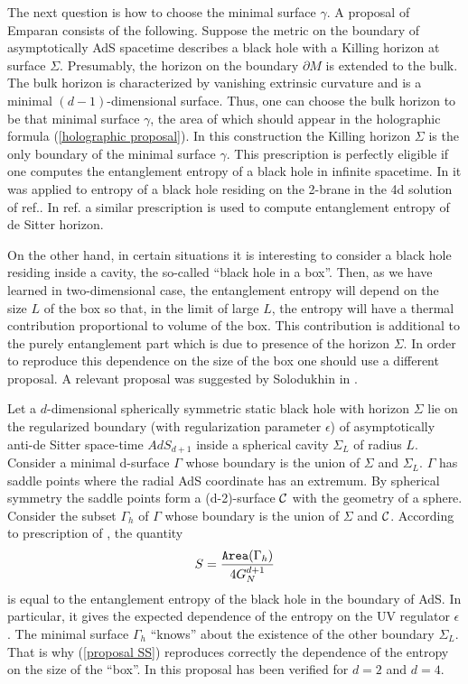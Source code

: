 \documentclass[12pt]{article}
\def\be{\begin{eqnarray}}
\def\ee{\end{eqnarray}}
\def\lb{\label}
\begin{document}
The next question is how to choose the minimal surface $\gamma$. A proposal of Emparan \cite{Emparan:2006ni} consists of the following. Suppose the metric on the boundary of asymptotically AdS spacetime describes a black hole with a Killing horizon at surface $\Sigma$. Presumably, the horizon on the boundary $\partial M$ is extended to the bulk.
The bulk horizon is characterized by vanishing extrinsic curvature and is a minimal $(d-1)$-dimensional  surface. Thus, one can choose the bulk horizon to be that  minimal surface $\gamma$,
the area of which should appear in the holographic formula (\ref{holographic proposal}). In this construction the Killing horizon $\Sigma$ is the only boundary of  the
minimal surface $\gamma$. This prescription is perfectly eligible if one computes the  entanglement entropy of a black hole in infinite spacetime. In \cite{Emparan:2006ni} it was applied to entropy of a black hole residing on the 2-brane in the 4d solution
of ref.\cite{Emparan:1999wa}.  In ref.\cite{Iwashita:2006zj} a similar prescription is used to compute entanglement entropy of de Sitter horizon.

On the other hand, in certain situations it is interesting to consider a black hole residing inside a cavity, the so-called ``black hole in a box''. Then, as we have learned  in two-dimensional case, the entanglement entropy will depend on the size $L$ of the box so that, in the limit of large $L$, the entropy will have a thermal contribution proportional to volume of the box. This contribution is additional to the purely entanglement part which is due to presence of the horizon $\Sigma$. In order to reproduce this dependence on the size of the box one should use a different proposal. A relevant proposal was suggested  by Solodukhin in \cite{Solodukhin:2006xv}. 

Let a $d$-dimensional spherically symmetric static black
hole with horizon $\Sigma$
 lie on the regularized boundary (with regularization parameter $\epsilon$)
of asymptotically anti-de Sitter space-time  $AdS_{d+1}$ inside a
spherical cavity $\Sigma_L$ of radius $L$. Consider a minimal
d-surface $\Gamma$ whose boundary is the union of $\Sigma$ and
$\Sigma_L$. $\Gamma$ has saddle points where the radial AdS
coordinate  has an extremum. By spherical symmetry the saddle points
form a (d-2)-surface ${\cal C}$ with the geometry of a sphere. Consider
the subset $\Gamma_h$ of $\Gamma$ whose boundary is  the union of
$\Sigma$ and ${\cal C}$. According to prescription of \cite{Solodukhin:2006xv}, the quantity
\be S={{\tt Area}(\Gamma_h)\over 4 G_N^{d+1}}
 \lb{proposal SS} 
 \ee is
equal to the entanglement entropy of the black hole in the boundary of
AdS. In particular, it gives the expected dependence of the
entropy on the UV regulator $\epsilon$. The minimal surface $\Gamma_h$ ``knows'' about the existence of the other boundary $\Sigma_L$. That is why (\ref{proposal SS}) reproduces correctly the dependence of the entropy on the size of the ``box''. 
In \cite{Solodukhin:2006xv} this proposal has been verified for $d=2$ and $d=4$.
\end{document}
